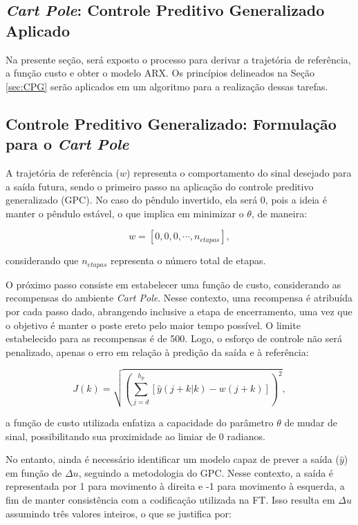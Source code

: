 \documentclass[12pt,           %
a4paper,                       %
openany,                       %
oneside,                       %
chapter=TITLE,                 %
english,                       %
spanish,                       %
brazil,                        %
sumario=tradicional]{abntex2}  %
\begin{document}
\begin{OnehalfSpace}
\section{\textit{Cart Pole}: Controle Preditivo Generalizado Aplicado}
\label{sec:GPCcartpole}    

Na presente seção, será exposto o processo para derivar a trajetória de referência, a função custo e obter o modelo ARX. Os princípios delineados na Seção \ref{sec:CPG} serão aplicados em um algoritmo para a realização dessas tarefas.

\subsection{Controle Preditivo Generalizado: Formulação para o \textit{Cart Pole}}
\label{subsec:GPCfor}  

A trajetória de referência ($w$) representa o comportamento do sinal desejado para a saída futura, sendo o primeiro passo na aplicação do controle preditivo generalizado (GPC). No caso do pêndulo invertido, ela será 0, pois a ideia é manter o pêndulo estável, o que implica em minimizar o $\theta$, de maneira:

\begin{equation}
    w = [0, 0, 0, \cdots, n_{etapas}],
    \label{eq:traref}
\end{equation}

\noindent considerando que $n_{etapas}$ representa o número total de etapas.

O próximo passo consiste em estabelecer uma função de custo, considerando as recompensas do ambiente \textit{Cart Pole}. Nesse contexto, uma recompensa é atribuída por cada passo dado, abrangendo inclusive a etapa de encerramento, uma vez que o objetivo é manter o poste ereto pelo maior tempo possível. O limite estabelecido para as recompensas é de 500\cite{gymcartpole}. Logo, o esforço de controle não será penalizado, apenas o erro em relação à predição da saída e à referência:

\begin{equation}
    J(k) =\sqrt{(\sum_{j=d}^{h_p} [\hat{y}(j+k|k) - w(j+k)])^2},
    \label{eq:FO}
\end{equation}

\noindent a função de custo utilizada enfatiza a capacidade do parâmetro $\theta$ de mudar de sinal, possibilitando sua proximidade ao limiar de 0 radianos.

No entanto, ainda é necessário identificar um modelo capaz de prever a saída ($\hat{y}$) em função de $\Delta u$, seguindo a metodologia do GPC. Nesse contexto, a saída é representada por 1 para movimento à direita e -1 para movimento à esquerda, a fim de manter consistência com a codificação utilizada na FT.  Isso resulta em $\Delta u$ assumindo três valores inteiros, o que se justifica por:


\end{OnehalfSpace}
\end{document}
